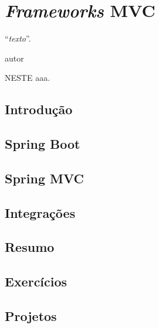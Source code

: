 \chapter{\textit{Frameworks} MVC}
\epigraph{``\textit{texto}''.}{autor}

\lettrine[lines=4, lhang=0.1, lraise=0, loversize=0.2, findent=0.1em]{\textcolor{corAzulTema}{N}}{ESTE} aaa.

\section{Introdução}

\section{Spring Boot}

\section{Spring MVC}

\section{Integrações}

\section{Resumo}

\section{Exercícios}

\section{Projetos}

